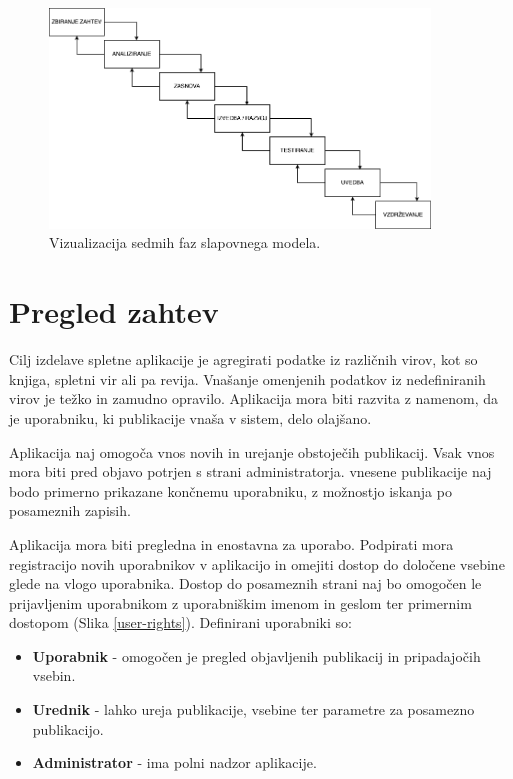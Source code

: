 \documentclass[a4paper, 12pt]{book}
\begin{document}
\begin{figure}[h]
\begin{center}
\includegraphics[width=0.9\textwidth]{slike/waterfall.png}
\end{center}
\caption{ Vizualizacija sedmih faz slapovnega modela. }
\label{waterfall-phases}
\end{figure}

\section{Pregled zahtev}
Cilj izdelave spletne aplikacije je agregirati podatke iz različnih virov, kot so knjiga, spletni vir ali pa revija. Vnašanje omenjenih podatkov iz nedefiniranih virov je težko in zamudno opravilo. Aplikacija mora biti razvita z namenom, da je uporabniku, ki publikacije vnaša v sistem, delo olajšano.

Aplikacija naj omogoča vnos novih in urejanje obstoječih publikacij. Vsak vnos mora biti pred objavo potrjen s strani administratorja. vnesene publikacije naj bodo primerno prikazane končnemu uporabniku, z možnostjo iskanja po posameznih zapisih.


Aplikacija mora biti pregledna in enostavna za uporabo. Podpirati mora registracijo novih uporabnikov v aplikacijo in omejiti dostop do določene vsebine glede na vlogo uporabnika. Dostop do posameznih strani naj bo omogočen le prijavljenim uporabnikom z uporabniškim imenom in geslom ter primernim dostopom (Slika \ref{user-rights}). Definirani uporabniki so:
\begin{itemize}
\item \textbf{Uporabnik} - omogočen je pregled objavljenih publikacij in pripadajočih vsebin.
\item \textbf{Urednik} - lahko ureja publikacije, vsebine ter parametre za posamezno publikacijo.
\item \textbf{Administrator} - ima polni nadzor aplikacije.
\end{itemize}
\end{document}
